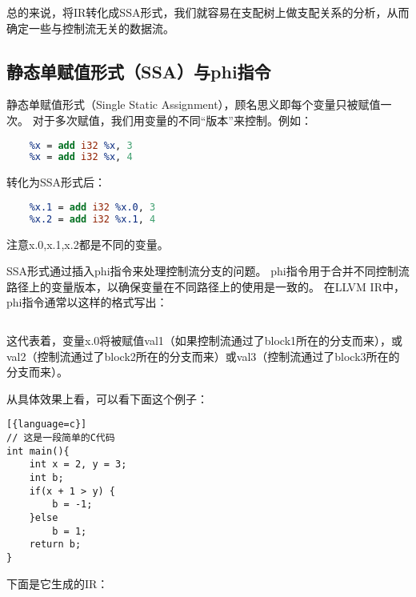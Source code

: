 总的来说，将IR转化成SSA形式，我们就容易在支配树上做支配关系的分析，从而确定一些与控制流无关的数据流。

\subsection{静态单赋值形式（SSA）与phi指令}
静态单赋值形式（Single Static Assignment），顾名思义即每个变量只被赋值一次。
对于多次赋值，我们用变量的不同“版本”来控制。例如：
\begin{lstlisting}[language=LLVM]
    %x = add i32 1, 2
    %x = add i32 %x, 3
    %x = add i32 %x, 4
\end{lstlisting}

转化为SSA形式后：
\begin{lstlisting}[language=LLVM]
    %x.0 = add i32 1, 2
    %x.1 = add i32 %x.0, 3
    %x.2 = add i32 %x.1, 4
\end{lstlisting}

注意x.0,x.1,x.2都是不同的变量。

SSA形式通过插入phi指令来处理控制流分支的问题。
phi指令用于合并不同控制流路径上的变量版本，以确保变量在不同路径上的使用是一致的。
在LLVM IR中，phi指令通常以这样的格式写出：
\begin{lstlisting}[language=LLVM]
    %x.0 = phi <type> [ <val1>, <block1> ], [ <val2>, <block2> ], [ <val3>, <block3> ]
\end{lstlisting}

这代表着，变量x.0将被赋值val1（如果控制流通过了block1所在的分支而来），或val2（控制流通过了block2所在的分支而来）或val3（控制流通过了block3所在的分支而来）。

从具体效果上看，可以看下面这个例子：
\begin{lstlisting}[{language=c}]
// 这是一段简单的C代码
int main(){
	int x = 2, y = 3;
	int b;
	if(x + 1 > y) {
		b = -1;
	}else
		b = 1;
    return b;
}
\end{lstlisting}

下面是它生成的IR：

